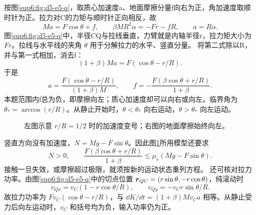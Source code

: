 \begin{solution}
按图\ref{sup6:fig:d5-e5-q}，取质心加速度a、地面摩擦分量f向右为正，角加速度取顺时针为正。拉力对C的力矩与顺时针正向相反，故
\[
Ma=F\cos\theta+f,\qquad
\beta MR^2\alpha=-Fr-fR,\qquad a=R\alpha.
\]
图\ref{sup6:fig:d5-e5-q}中，半径CQ与拉线垂直，力臂就是内轴半径r，拉力矩大小为 $Fr$。拉线与水平线的夹角 $\theta$ 用于分解拉力的水平、竖直分量。
将第二式除以R，并与第一式相加，消去f：
\[
(1+\beta)Ma=F(\cos\theta-r/R).
\]
于是
\[
a=\frac{F(\cos\theta-r/R)}{(1+\beta)M},\qquad
f=-\frac{F(\beta\cos\theta+r/R)}{1+\beta}.
\]
本题范围内f总为负，即摩擦向左；质心加速度却可以向右或向左。临界角为 $\theta_*=\arccos(r/R)$。从静止开始时，$\theta<\theta_*$ 向右运动，$\theta>\theta_*$ 向左运动。
\begin{figure}[H]\centering
{}
\caption{左图示意 $r/R=1/2$ 时的加速度变号；右图的地面摩擦始终向左。}\label{sup6:fig:d5-e5-s}
\end{figure}
竖直方向没有加速度，$N=Mg-F\sin\theta$。因此图\ref{sup6:fig:d5-e5-s}所用模型还要求
\[
N>0,\qquad
\frac{F(\beta\cos\theta+r/R)}{1+\beta}
\le\mu_s(Mg-F\sin\theta).
\]
接触一旦失效，或摩擦超过极限，就须按新的运动状态重列方程。
还可核对拉力功率。由图\ref{sup6:fig:d5-e5-q}中的切点位置
$\bm{r}_{QC}=(r\sin\theta,-r\cos\theta)$，纯滚动时
\[
v_{Qx}=v_C(1-r\cos\theta/R),\qquad
v_{Qy}=-v_Cr\sin\theta/R.
\]
故拉力功率为 $Fv_C(\cos\theta-r/R)$，与
$\dd K/\dd t=(1+\beta)Mv_Ca$ 相等。从静止受力后向左运动时，$v_C$ 和括号均为负，输入功率仍为正。
\end{solution}



